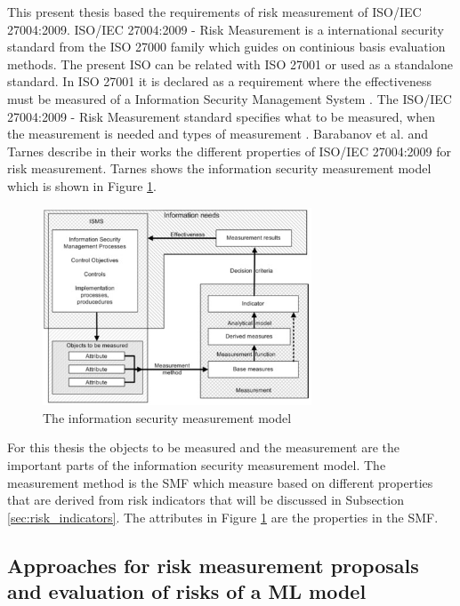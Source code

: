 This present thesis based the requirements of risk measurement of ISO/IEC 27004:2009. ISO/IEC 27004:2009 - Risk Measurement is a international security standard from the ISO 27000
\cite{DBLP:conf/euspn/MeriahR19} family which guides on continious basis evaluation methods. The present ISO can be related with ISO 27001 or used as a standalone standard. In ISO 27001
it is declared as a requirement where the effectiveness must be measured of a Information Security Management System \cite{barabanov2011information}. The ISO/IEC 27004:2009 - Risk
Measurement standard specifies what to be measured, when the measurement is needed and types of measurement \cite{lundholm2011design}. Barabanov et al. \cite{barabanov2011information} and
Tarnes \cite{tarnes2012information} describe in their works the different properties of ISO/IEC 27004:2009 for risk measurement. Tarnes shows the information security measurement model
which is shown in Figure \ref{fig:is_measurement_model}.

\begin{figure}[ht!]
  \centering
  \includegraphics[width=8cm]{pictures/is_measurement_model.jpg}
  \caption{The information security measurement model \cite{tarnes2012information}}
  \label{fig:is_measurement_model}
\end{figure}

For this thesis the objects to be measured and the measurement are the important parts of the information security measurement model. The measurement method is the SMF which measure based
on different properties that are derived from risk indicators that will be discussed in Subsection \ref{sec:risk_indicators}. The attributes in Figure \ref{fig:is_measurement_model} are
the properties in the SMF.

\subsection{Approaches for risk measurement proposals and evaluation of risks of a ML model}
\label{sec:approaches}

